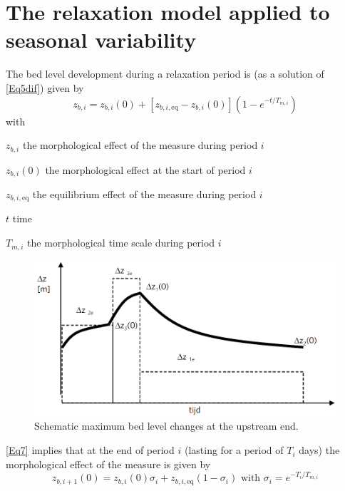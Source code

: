 \section{The relaxation model applied to seasonal variability}

The bed level development during a relaxation period is (as a solution of \autoref{Eq5dif}) given by
%
\begin{equation}
z_{b,i} = z_{b,i} (0) + [z_{b,i,\text{eq}} - z_{b,i}(0)](1 - e^{-t/T_{m,i}})
\label{Eq7}
\end{equation}
%
with
%
\begin{symbollist}
\item[$z_{b,i}$]  the morphological effect of the measure during period $i$
\item[$z_{b,i}(0)$]  the morphological effect at the start of period $i$
\item[$z_{b,i,\text{eq}}$]  the equilibrium effect of the measure during period $i$
\item[$t$]  time
\item[$T_{m,i}$]  the morphological time scale during period $i$
\end{symbollist}

\begin{figure}
\includegraphics[width=\columnwidth]{figures/Fig5.png}
\caption{Schematic maximum bed level changes at the upstream end.}
\label{Fig5}
\end{figure}

\autoref{Eq7} implies that at the end of period $i$ (lasting for a period of $T_i$ days) the morphological effect of the measure is given by
%
\begin{equation}
z_{b,i+1}(0) = z_{b,i} (0) \sigma_i + z_{b,i,\text{eq}} (1-\sigma_i) \text{ with } \sigma_i = e^{-T_i/T_{m,i}}
\label{Eq8a}
\end{equation}

